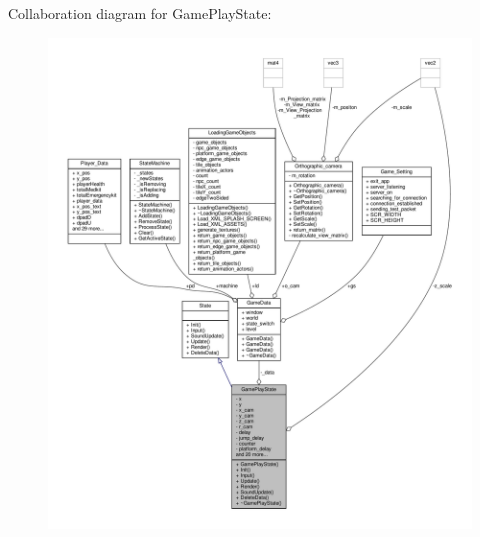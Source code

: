 Collaboration diagram for Game\+Play\+State\+:
\nopagebreak
\begin{figure}[H]
\begin{center}
\leavevmode
\includegraphics[width=350pt]{classGamePlayState__coll__graph}
\end{center}
\end{figure}
